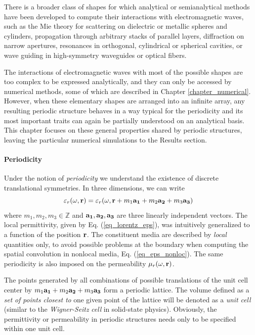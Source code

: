 There is a broader class of shapes for which analytical or semianalytical methods have been developed to compute their interactions with electromagnetic waves, such as the Mie theory for scattering on dielectric or metallic spheres and cylinders, propagation through arbitrary stacks of parallel layers, diffraction on narrow apertures, resonances in orthogonal, cylindrical or spherical cavities, or wave guiding in high-symmetry waveguides or optical fibers. 

The interactions of electromagnetic waves with most of the possible shapes are too complex to be expressed analytically, and they can only be accessed by numerical methods, some of which are described in Chapter \ref{chapter_numerical}. However, when these elementary shapes are arranged into an infinite array, any resulting periodic structure behaves in a way typical for the periodicity and its most important traits can again be partially understood on an analytical basis.
This chapter focuses on these general properties shared by periodic structures, leaving the particular numerical simulations to the Results section.

\paragraph{Periodicity}%
Under the notion of \textit{periodicity} we understand the existence of discrete translational symmetries. In three dimensions, we can write
\begin{equation} \varepsilon_r(\omega, {\mathbf{r}}) = \varepsilon_r(\omega, {\mathbf{r}} + m_1 {\mathbf{a_1}} + m_2 {\mathbf{a_2}} + m_3 {\mathbf{a_3}}) \label{eq_trsym}\end{equation}
where $m_1, m_2, m_3 \in \mathbb{Z}$ and ${\mathbf{a_1}}, {\mathbf{a_2}}, {\mathbf{a_3}}$ are three linearly independent vectors. The local permittivity, given by Eq. (\ref{eq_lorentz_eps}), was intuitively generalized to a function of the position ${\mathbf{r}}$. The constituent media are described by \textit{local} quantities only, to avoid possible problems at the boundary when computing the spatial convolution  in nonlocal media, Eq. (\ref{eq_eps_nonloc}).  The same periodicity is also imposed on the permeability $\mu_r(\omega,{\mathbf{r}})$. 

The points generated by all combinations of possible translations of the unit cell center by $m_1 {\mathbf{a_1}} + m_2 {\mathbf{a_2}} + m_3 {\mathbf{a_3}}$ form a periodic lattice.
The volume defined as a \textit{set of points closest to} one given point of the lattice will be denoted as a \textit{unit cell} (similar to the \textit{Wigner-Seitz cell} in solid-state physics). Obviously, the permittivity or permeability in periodic structures needs only to be specified within one unit cell.

